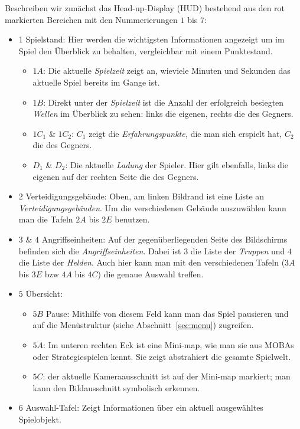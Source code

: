 Beschreiben wir zunächst das Head-up-Display (HUD) bestehend aus den rot markierten Bereichen mit den Nummerierungen $1$ bis $7$:
\begin{itemize}[leftmargin=*]
	\item{1 Spielstand:} Hier werden die wichtigsten Informationen angezeigt um im Spiel den Überblick zu behalten, vergleichbar mit einem Punktestand.
	\begin{itemize}
		\item{$1 A$: Die aktuelle \textit{Spielzeit} zeigt an, wieviele Minuten und Sekunden das aktuelle Spiel bereits im Gange ist.}
		\item{$1 B$: Direkt unter der \textit{Spielzeit} ist die Anzahl der erfolgreich besiegten \textit{Wellen} im Überblick zu sehen: links die eigenen, rechts die des Gegners.}
		\item{$1 C_{1}$ \& $1C_{2}$:} $C_{1}$ zeigt die \textit{Erfahrungspunkte,} die man sich erspielt hat, $C_{2}$ die des Gegners.
		\item{$D_{1}$ \& $D_{2}$:} Die aktuelle \emph{Ladung} der Spieler. Hier gilt ebenfalls, links die eigenen auf der rechten Seite die des Gegners.
	\end{itemize}
	\item {$2$ Verteidigungsgebäude:} Oben, am linken Bildrand ist eine Liste an \textit{Verteidigungsgebäuden}. Um die verschiedenen Gebäude auszuwählen kann man die Tafeln $2 A$ bis $2 E$ benutzen.
	\item {$3$ \& $4$ Angriffseinheiten:} Auf der gegenüberliegenden Seite des Bildschirms befinden sich die \textit{Angriffseinheiten}. Dabei ist $3$ die Liste der \textit{Truppen} und $4$ die Liste der \textit{Helden}. Auch hier kann man mit den verschiedenen Tafeln ($3 A$ bis $3 E$ bzw $4 A$ bis $4 C$) die genaue Auswahl treffen.
	\item {$5$ Übersicht:}
	\begin{itemize}
		\item{$5 B$ Pause: Mithilfe von diesem Feld kann man das Spiel pausieren und auf die Menüstruktur (siehe Abschnitt~\ref{sec:menu}) zugreifen.}
		\item{$5 A$: Im unteren rechten Eck ist eine Mini-map, wie man sie aus MOBAs oder Strategiespielen kennt. Sie zeigt abstrahiert die gesamte Spielwelt.}
		\item{$5 C$: der aktuelle Kameraausschnitt ist auf der Mini-map markiert; man kann den Bildausschnitt symbolisch erkennen.}
	\end{itemize}
	\item {$6$ Auswahl-Tafel: Zeigt Informationen über ein aktuell ausgewähltes Spielobjekt.}	\begin{itemize}

\end{itemize}
\end{itemize}

